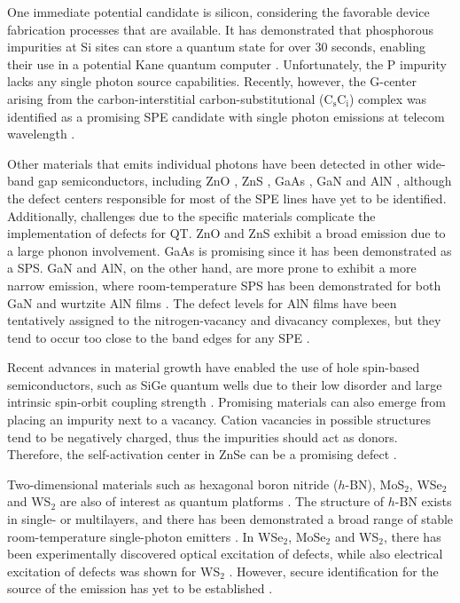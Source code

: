 One immediate potential candidate is silicon, considering the favorable device fabrication processes that are available. It has demonstrated that phosphorous impurities at Si sites can store a quantum state for over $30$ seconds, enabling their use in a potential Kane quantum computer \cite{Kane1998, Zhang2020}. Unfortunately, the P impurity lacks any single photon source capabilities. Recently, however, the G-center arising from the carbon-interstitial carbon-substitutional ($\text{C}_{\text{s}}\text{C}_{\text{i}}$) complex was identified as a promising SPE candidate with single photon emissions at telecom wavelength \cite{Redjem2020}.

Other materials that emits individual photons have been detected in other wide-band gap semiconductors, including ZnO \cite{Zheng2014, Morfa2012}, ZnS \cite{Stewart2019}, GaAs \cite{Bluhm2010}, GaN \cite{Roux2017, Gammon1996} and AlN \cite{Chung2018, Wang2014}, although the defect centers responsible for most of the SPE lines have yet to be identified.
Additionally, challenges due to the specific materials complicate the implementation of defects for QT. ZnO and ZnS exhibit a broad emission due to a large phonon involvement. GaAs is promising since it has been demonstrated as a SPS.
GaN and AlN, on the other hand, are more prone to exhibit a more narrow emission, where room-temperature SPS has been demonstrated for both GaN \cite{Berhane2018} and wurtzite AlN films \cite{Xue2020}. The defect levels for AlN films have been tentatively assigned to the nitrogen-vacancy and divacancy complexes, but they tend to occur too close to the band edges for any SPE \cite{Zhang2020, Varley2016}.

Recent advances in material growth have enabled the use of hole spin-based semiconductors, such as SiGe quantum wells due to their low disorder and large intrinsic spin-orbit coupling strength \cite{Hardy2019}. Promising materials can also emerge from placing an impurity next to a vacancy. Cation vacancies in possible structures tend to be negatively charged, thus the impurities should act as donors. Therefore, the self-activation center in ZnSe can be a promising defect \cite{Weber2010}.

Two-dimensional materials such as hexagonal boron nitride ($h$-BN), MoS$_2$, WSe$_2$ and WS$_2$ are also of interest as quantum platforms \cite{Toth2019, Atatuere2018}. The structure of $h$-BN exists in single- or multilayers, and there has been demonstrated a broad range of stable room-temperature single-photon emitters \cite{Tran2016, Tran2016a}. In WSe$_2$, MoSe$_2$ and WS$_2$, there has been experimentally discovered optical excitation of defects, while also electrical excitation of defects was shown for WS$_2$ \cite{Atatuere2018}. However, secure identification for the source of the emission has yet to be established \cite{Weston2018, Abdi2018, Atatuere2018}.

